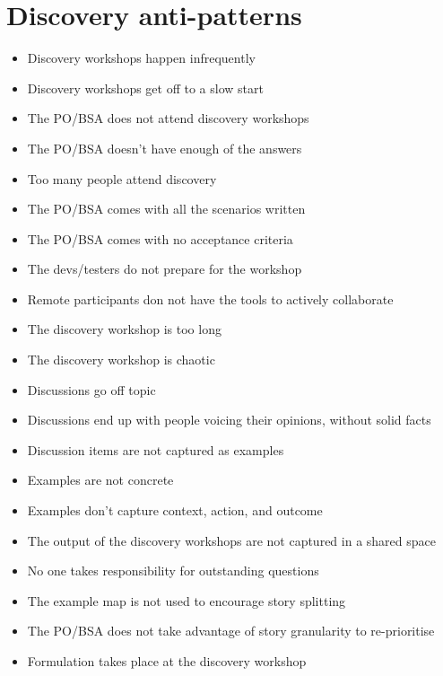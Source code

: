 \chapter*{Discovery anti-patterns}

\ifnotes

\fi

\ifcontent

    \begin{itemize}
        \item Discovery workshops happen infrequently
        \item Discovery workshops get off to a slow start
        \item The PO/BSA does not attend discovery workshops
        \item The PO/BSA doesn't have enough of the answers
        \item Too many people attend discovery
        \item The PO/BSA comes with all the scenarios written
        \item The PO/BSA comes with no acceptance criteria
        \item The devs/testers do not prepare for the workshop
        \item Remote participants don not have the tools to actively collaborate
        \item The discovery workshop is too long
        \item The discovery workshop is chaotic
        \item Discussions go off topic
        \item Discussions end up with people voicing their opinions, without solid facts
        \item Discussion items are not captured as examples
        \item Examples are not concrete
        \item Examples don't capture context, action, and outcome
        \item The output of the discovery workshops are not captured in a shared space
        \item No one takes responsibility for outstanding questions
        \item The example map is not used to encourage story splitting
        \item The PO/BSA does not take advantage of story granularity to re-prioritise
        \item Formulation takes place at the discovery workshop
    \end{itemize}

\fi